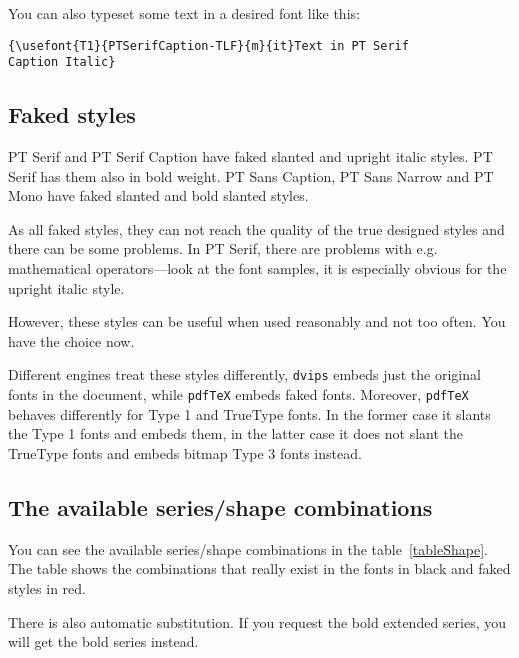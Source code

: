 \documentclass[oneside]{scrartcl}
\newcommand{\program}{\texttt}
\begin{document}
You can also typeset some text in a desired font like this:
\begin{verbatim}
{\usefont{T1}{PTSerifCaption-TLF}{m}{it}Text in PT Serif
Caption Italic}
\end{verbatim}


\subsection{Faked styles}
\label{faked-styles}

PT Serif and PT Serif Caption have faked slanted and upright italic styles. PT Serif has them also in bold weight.
PT Sans Caption, PT Sans Narrow and PT Mono have faked slanted and bold
slanted styles.

As all faked styles, they can not reach the quality of the true designed
styles and there can be some problems. In PT Serif, there are problems with
e.g. mathematical operators---look at the font samples, it is especially obvious
for the upright italic style.

However, these styles can be useful when used reasonably and not too often.
You have the choice now.

Different engines treat these styles differently, \program{dvips} embeds just
the original fonts in the document, while \program{pdf\TeX} embeds faked fonts.
Moreover, \program{pdf\TeX} behaves differently for Type 1 and TrueType fonts.
In the former case it slants the Type 1 fonts and embeds them, in the latter
case it does not slant the TrueType fonts and embeds bitmap Type 3 fonts instead.


\subsection{The available series/shape combinations}

You can see the available series/shape combinations in the
table~\ref{tableShape}. The table shows the combinations that really
exist in the fonts in black and faked styles in red.

There is also automatic substitution. If you request the bold extended series,
you will get the bold series instead.
\end{document}
